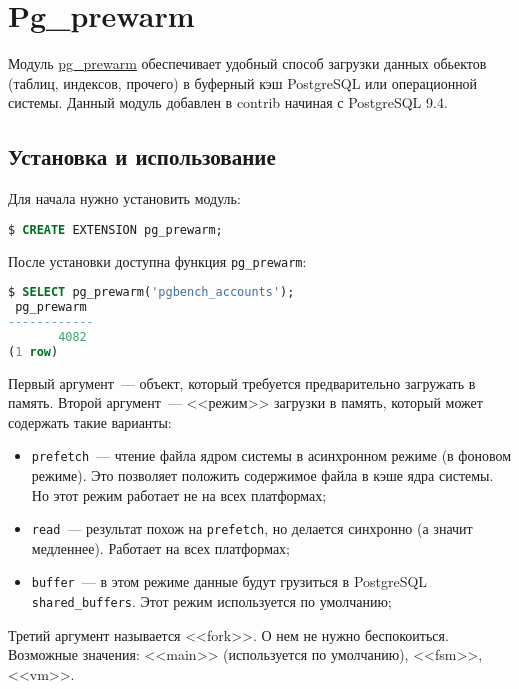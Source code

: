 \section{Pg\_prewarm}

Модуль \href{https://www.postgresql.org/docs/current/static/pgprewarm.html}{pg\_prewarm} обеспечивает удобный способ загрузки данных обьектов (таблиц, индексов, прочего) в буферный кэш PostgreSQL или операционной системы. Данный модуль добавлен в contrib начиная с PostgreSQL 9.4.


\subsection{Установка и использование}

Для начала нужно установить модуль:

\begin{lstlisting}[language=SQL,label=lst:pgprewarm1]
$ CREATE EXTENSION pg_prewarm;
\end{lstlisting}

После установки доступна функция \lstinline!pg_prewarm!:

\begin{lstlisting}[language=SQL,label=lst:pgprewarm2]
$ SELECT pg_prewarm('pgbench_accounts');
 pg_prewarm
------------
       4082
(1 row)
\end{lstlisting}

Первый аргумент~--- объект, который требуется предварительно загружать в память. Второй аргумент~--- <<режим>> загрузки в память, который может содержать такие варианты:

\begin{itemize}
  \item \lstinline!prefetch!~--- чтение файла ядром системы в асинхронном режиме (в фоновом режиме). Это позволяет положить содержимое файла в кэше ядра системы. Но этот режим работает не на всех платформах;
  \item \lstinline!read!~--- результат похож на \lstinline!prefetch!, но делается синхронно (а значит медленнее). Работает на всех платформах;
  \item \lstinline!buffer!~--- в этом режиме данные будут грузиться в PostgreSQL \lstinline!shared_buffers!. Этот режим используется по умолчанию;
\end{itemize}

Третий аргумент называется <<fork>>. О нем не нужно беспокоиться. Возможные значения: <<main>> (используется по умолчанию), <<fsm>>, <<vm>>.

